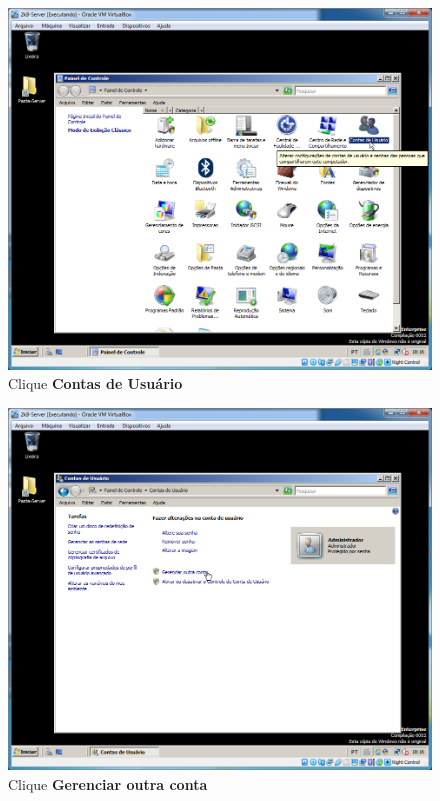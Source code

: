 \documentclass[10pt]{article}
\begin{document}
\begin{figure}[H]
    \centering
    \caption{Clique \textbf{Contas de Usuário}}
    \label{fig:ar002}
    \includegraphics[width=\linewidth]{images/acesso_remoto/ar002.png}
\end{figure}
\begin{figure}[H]
    \centering
    \caption{Clique \textbf{Gerenciar outra conta}}
    \label{fig:ar003}
    \includegraphics[width=\linewidth]{images/acesso_remoto/ar003.png}
\end{figure}
\end{document}
